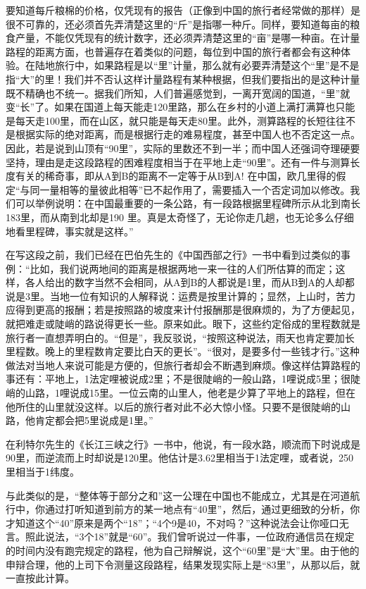 \documentclass[12pt,oneside]{book}
\begin{document}
\begin{common-format}
要知道每斤粮棉的价格，仅凭现有的报告（正像到中国的旅行者经常做的那样）是很不可靠的，还必须首先弄清楚这里的“斤”是指哪一种斤。同样，要知道每亩的粮食产量，不能仅凭现有的统计数字，还必须弄清楚这里的“亩”是哪一种亩。在计量路程的距离方面，也普遍存在着类似的问题，每位到中国的旅行者都会有这种体验。在陆地旅行中，如果路程是以“里”计量，那么就有必要弄清楚这个“里”是不是指“大”的里！我们并不否认这样计量路程有某种根据，但我们要指出的是这种计量既不精确也不统一。据我们所知，人们普遍感觉到，一离开宽阔的国道，“里”就变“长”了。如果在国道上每天能走120里路，那么在乡村的小道上满打满算也只能是每天走100里，而在山区，就只能是每天走80里。此外，测算路程的长短往往不是根据实际的绝对距离，而是根据行走的难易程度，甚至中国人也不否定这一点。因此，若是说到山顶有“90里”，实际的里数还不到一半；而中国人还强词夺理硬要坚持，理由是走这段路程的困难程度相当于在平地上走“90里”。还有一件与测算长度有关的稀奇事，即从A到B的距离不一定等于从B到A! 在中国，欧几里得的假定“与同一量相等的量彼此相等”已不起作用了，需要插入一个否定词加以修改。我们可以举例说明：在中国最重要的一条公路，有一段路根据里程碑所示从北到南长183里，而从南到北却是190 里。真是太奇怪了，无论你走几趟，也无论多么仔细地看里程碑，事实就是这样。”

在写这段之前，我们已经在巴伯先生的《中国西部之行》一书中看到过类似的事例：“比如，我们说两地间的距离是根据两地一来一往的人们所估算的而定；这样，各人给出的数字当然不会相同，从A到B的人都说是1里，而从B到A的人却都说是3里。当地一位有知识的人解释说：运费是按里计算的；显然，上山时，苦力应得到更高的报酬；若是按照路的坡度来计付报酬那是很麻烦的，为了方便起见，就把难走或陡峭的路说得更长一些。原来如此。眼下，这些约定俗成的里程数就是旅行者一直想弄明白的。“但是”，我反驳说，“按照这种说法，雨天也肯定要加长里程数。晚上的里程数肯定要比白天的更长”。“很对，是要多付一些钱才行。”这种做法对当地人来说可能是方便的，但旅行者却会不断遇到麻烦。像这样估算路程的事还有：平地上，1法定哩被说成2里；不是很陡峭的一般山路，1哩说成5里；很陡峭的山路，1哩说成15里。一位云南的山里人，他老是少算了平地上的路程，但在他所住的山里就没这样。以后的旅行者对此不必大惊小怪。只要不是很陡峭的山路，他肯定都会把5里说成是1里。” 

在利特尔先生的《长江三峡之行》一书中，他说，有一段水路，顺流而下时说成是90里，而逆流而上时却说是120里。他估计是3.62里相当于1法定哩，或者说，250里相当于1纬度。

与此类似的是，“整体等于部分之和”这一公理在中国也不能成立，尤其是在河道航行中，你通过打听知道到前方的某一地点有“40里”，然后，通过更细致的分析，你才知道这个“40”原来是两个“18”；“4个9是40，不对吗？”这种说法会让你哑口无言。照此说法，“3个18”就是“60”。我们曾听说过一件事，一位政府通信员在规定的时间内没有跑完规定的路程，他为自己辩解说，这个“60里”是“大”里。由于他的申辩合理，他的上司下令测量这段路程，结果发现实际上是“83里”，从那以后，就一直按此计算。 


\end{common-format}
\end{document}
